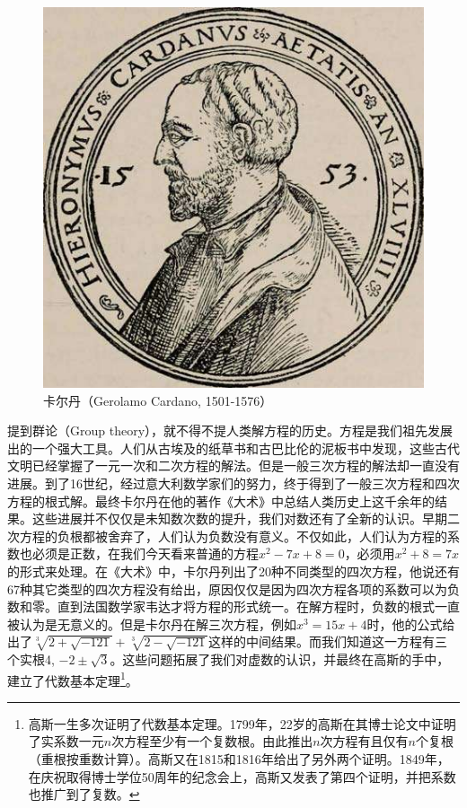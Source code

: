 \documentclass[b5paper]{ctexart}
\begin{document}
\begin{figure}[htbp]
 \centering
 \includegraphics[scale=0.3]{img/Cardano.jpg}
 \captionsetup{labelformat=empty}
 \caption{卡尔丹（Gerolamo Cardano, 1501-1576）}
 \label{fig:Cardano}
\end{figure}

提到群论（Group theory），就不得不提人类解方程的历史。方程是我们祖先发展出的一个强大工具。人们从古埃及的纸草书和古巴比伦的泥板书中发现，这些古代文明已经掌握了一元一次和二次方程的解法。但是一般三次方程的解法却一直没有进展。到了16世纪，经过意大利数学家们的努力，终于得到了一般三次方程和四次方程的根式解。最终卡尔丹在他的著作《大术》中总结人类历史上这千余年的结果。这些进展并不仅仅是未知数次数的提升，我们对数还有了全新的认识。早期二次方程的负根都被舍弃了，人们认为负数没有意义。不仅如此，人们认为方程的系数也必须是正数，在我们今天看来普通的方程$x^2 - 7x + 8 = 0$，必须用$x^2 + 8 = 7x$的形式来处理。在《大术》中，卡尔丹列出了20种不同类型的四次方程，他说还有67种其它类型的四次方程没有给出，原因仅仅是因为四次方程各项的系数可以为负数和零\cite{HanXueTao2012}。直到法国数学家韦达才将方程的形式统一。在解方程时，负数的根式一直被认为是无意义的。但是卡尔丹在解三次方程，例如$x^3 = 15x +4$时，他的公式给出了$\sqrt[3]{2 + \sqrt{-121}} + \sqrt[3]{2 - \sqrt{-121}}$这样的中间结果。而我们知道这一方程有三个实根4, $-2 \pm \sqrt{3}$。这些问题拓展了我们对虚数的认识，并最终在高斯的手中，建立了代数基本定理\footnote{高斯一生多次证明了代数基本定理。1799年，22岁的高斯在其博士论文中证明了实系数一元$n$次方程至少有一个复数根。由此推出$n$次方程有且仅有$n$个复根（重根按重数计算）。高斯又在1815和1816年给出了另外两个证明。1849年，在庆祝取得博士学位50周年的纪念会上，高斯又发表了第四个证明，并把系数也推广到了复数。}。
\end{document}
